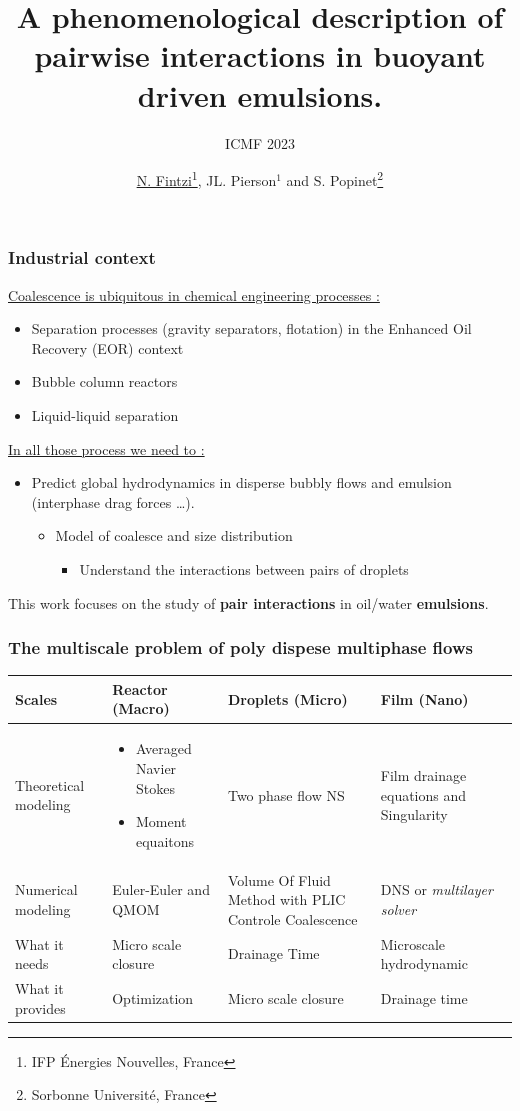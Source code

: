 \documentclass{sintefbeamer}
\title{A phenomenological description of pairwise interactions in buoyant driven emulsions.}
\subtitle{ICMF 2023}
\author{\href{http://basilisk.fr/sandbox/fintzin/Rising-Suspenion/RS.c}{\underline{N. Fintzi}\footnote{IFP \'Energies Nouvelles, France}, JL. Pierson$^1$} and S. Popinet\footnote{Sorbonne Universit\'e, France}}
\begin{document}
\maketitle

\begin{frame}
  \frametitle{Industrial context}
  \underline{Coalescence is ubiquitous in chemical engineering processes :}
  \begin{itemize}
    \item Separation processes (gravity separators, flotation) in the Enhanced Oil Recovery (EOR) context
    \item Bubble column reactors
    \item Liquid-liquid separation
  \end{itemize}
  \vfill
  \underline{In all those process we need to : }
  \begin{itemize}
    \item Predict global hydrodynamics in disperse bubbly flows and emulsion (interphase drag forces \ldots).
    \begin{itemize}
      \item Model of coalesce and size distribution 
      \begin{itemize}
        \item Understand the interactions between pairs of droplets
      \end{itemize}
    \end{itemize}
  \end{itemize}

  \vfill
  This work focuses on the study of \textbf{pair interactions} in oil/water \textbf{emulsions}.
\end{frame}

\begin{frame}
  \frametitle{The multiscale problem of poly dispese multiphase flows}
  \begin{tabular}{||p{3cm}||p{3cm}||p{3cm}||p{3cm}||}\hline
    Scales & 
    Reactor (Macro) & 
    Droplets (Micro) & 
    Film (Nano) \\\hline
    Theoretical modeling & 
    \begin{itemize}
      \item Averaged Navier Stokes
      \item Moment equaitons
    \end{itemize}& \cellcolor[HTML]{AA0044}
    Two phase flow NS& 
    Film drainage equations and Singularity \\\hline
    Numerical modeling &
    Euler-Euler and QMOM &\cellcolor[HTML]{AA0044} 
     Volume Of Fluid Method with PLIC
     Controle Coalescence&
     DNS or \textit{multilayer solver}\\\hline
    What it needs &
     Micro scale closure&
     Drainage Time &
     Microscale hydrodynamic\\\hline
    What it provides & 
    Optimization & \cellcolor[HTML]{AA0044}
    Micro scale closure &
     Drainage time\\\hline
  \end{tabular}
\end{frame}
\end{document}
